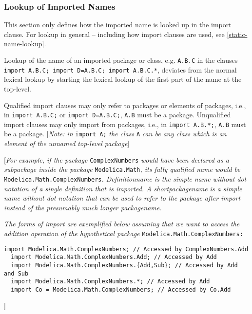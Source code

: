 \subsubsection{Lookup of Imported Names}

This section only defines how the imported name is looked up in the
import clause. For lookup in general -- including how import clauses are
used, see \autoref{static-name-lookup}.

Lookup of the name of an imported package or class, e.g. \lstinline[basicstyle=\ttfamily]!A.B.C! in the
clauses \lstinline[basicstyle=\ttfamily]!import A.B.C; import D=A.B.C; import A.B.C.*!, deviates from the
normal lexical lookup by starting the lexical lookup of the first part
of the name at the top-level.

Qualified import clauses may only refer to packages or elements of
packages, i.e., in \lstinline[basicstyle=\ttfamily]!import A.B.C;! or \lstinline[basicstyle=\ttfamily]!import D=A.B.C;!, 
\lstinline[basicstyle=\ttfamily]!A.B! must be a
package. Unqualified import clauses may only import from packages, i.e.,
in \lstinline[basicstyle=\ttfamily]!import A.B.*;!, \lstinline[basicstyle=\ttfamily]!A.B! must be a package. {[}\emph{Note: in} \lstinline[basicstyle=\ttfamily]!import A;!
\emph{the class} \lstinline[basicstyle=\ttfamily]!A! \emph{can be any class which is an element of the
unnamed top-level package}{]}

{[}\emph{For example, if the package} \lstinline[basicstyle=\ttfamily]!ComplexNumbers! \emph{would have
been declared as a subpackage inside the package} \lstinline[basicstyle=\ttfamily]!Modelica.Math!\emph{,
its fully qualified name would be} \lstinline[basicstyle=\ttfamily]!Modelica.Math.ComplexNumbers!\emph{.
Definitionname is the simple name without dot notation of a single
definition that is imported. A shortpackagename is a simple name without
dot notation that can be used to refer to the package after import
instead of the presumably much longer packagename.}

\emph{The forms of import are exemplified below assuming that we want to
access the addition operation of the hypothetical package}
\lstinline[basicstyle=\ttfamily]!Modelica.Math.ComplexNumbers:!

\begin{lstlisting}[language=modelica]
  import Modelica.Math.ComplexNumbers; // Accessed by ComplexNumbers.Add
  import Modelica.Math.ComplexNumbers.Add; // Accessed by Add
  import Modelica.Math.ComplexNumbers.{Add,Sub}; // Accessed by Add and Sub
  import Modelica.Math.ComplexNumbers.*; // Accessed by Add
  import Co = Modelica.Math.ComplexNumbers; // Accessed by Co.Add
\end{lstlisting}
{]}

